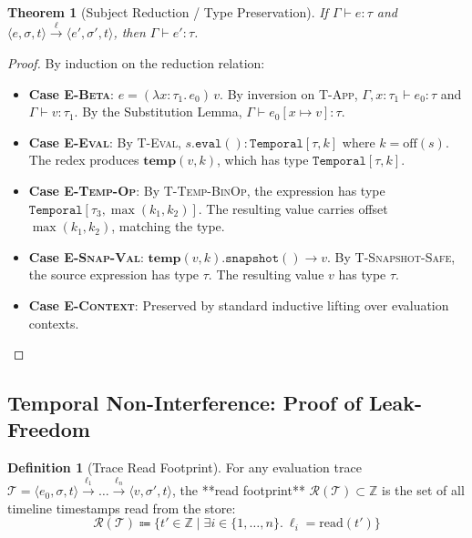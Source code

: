 \documentclass[11pt,a4paper]{article}
\theoremstyle{definition}
\newtheorem{definition}{Definition}[section]
\theoremstyle{plain}
\newtheorem{theorem}{Theorem}[section]
\newcommand{\ty}[1]{\texttt{#1}}
\newcommand{\step}[1]{\xrightarrow{#1}}
\newcommand{\Temp}{\ty{Temporal}}
\begin{document}
\begin{theorem}[Subject Reduction / Type Preservation]
If $\Gamma \vdash e : \tau$ and $\langle e, \sigma, t \rangle \step{\ell} \langle e', \sigma', t \rangle$, then $\Gamma \vdash e' : \tau$.
\end{theorem}
\begin{proof}
By induction on the reduction relation:
\begin{itemize}[leftmargin=1.5em]
  \item \textbf{Case \textsc{E-Beta}}: $e = (\lambda x:\tau_1.\, e_0)\, v$. By inversion on \textsc{T-App}, $\Gamma, x : \tau_1 \vdash e_0 : \tau$ and $\Gamma \vdash v : \tau_1$. By the Substitution Lemma, $\Gamma \vdash e_0[x \mapsto v] : \tau$.
  \item \textbf{Case \textsc{E-Eval}}: By \textsc{T-Eval}, $s.\ty{eval}() : \Temp[\tau, k]$ where $k = \text{off}(s)$. The redex produces $\mathbf{temp}(v, k)$, which has type $\Temp[\tau, k]$.
  \item \textbf{Case \textsc{E-Temp-Op}}: By \textsc{T-Temp-BinOp}, the expression has type $\Temp[\tau_3, \max(k_1, k_2)]$. The resulting value carries offset $\max(k_1, k_2)$, matching the type.
  \item \textbf{Case \textsc{E-Snap-Val}}: $\mathbf{temp}(v, k).\ty{snapshot}() \step{} v$. By \textsc{T-Snapshot-Safe}, the source expression has type $\tau$. The resulting value $v$ has type $\tau$.
  \item \textbf{Case \textsc{E-Context}}: Preserved by standard inductive lifting over evaluation contexts. \qedhere
\end{itemize}
\end{proof}

\subsection{Temporal Non-Interference: Proof of Leak-Freedom}

\begin{definition}[Trace Read Footprint]
For any evaluation trace $\mathcal{T} = \langle e_0, \sigma, t \rangle \step{\ell_1} \dots \step{\ell_n} \langle v, \sigma', t \rangle$, the **read footprint** $\mathcal{R}(\mathcal{T}) \subset \mathbb{Z}$ is the set of all timeline timestamps read from the store:
\[
\mathcal{R}(\mathcal{T}) \Coloneqq \{t' \in \mathbb{Z} \mid \exists i \in \{1,\dots,n\}.\ \ell_i = \text{read}(t')\}
\]
\end{definition}
\end{document}
